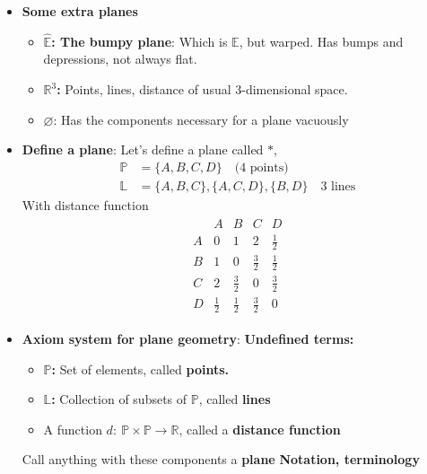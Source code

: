 \documentclass{report}
\begin{document}
\begin{itemize}
    \item \textbf{Some extra planes}
        \begin{itemize}
            \item \textbf{$\hat{\mathbb{E}}$: The bumpy plane}: Which is $\mathbb{E}$, but warped. Has bumps and depressions, not always flat.
            \item \textbf{$\mathbb{R}^{3}$:} Points, lines, distance of usual 3-dimensional space.
            \item \textbf{$\varnothing$}: Has the components necessary for a plane vacuously
        \end{itemize}
    \item \textbf{Define a plane}: Let's define a plane called $*$, 
        \begin{align*}
            \mathbb{P} &= \{A,B,C,D\} \quad \text{(4 points)} \\
            \mathbb{L} &= \{A,B,C\}, \{A,C,D\}, \{B,D\} \quad \text{3 lines}
        \end{align*}
        With distance function
        \begin{align*}
            \begin{array}{c|cccc}
               &A&B&C&D \\
               \hline
                A&0&1&2&\frac{1}{2} \\
                B&1&0&\frac{3}{2} &\frac{1}{2} \\
                C&2&\frac{3}{2}&0&\frac{3}{2} \\
                D&\frac{1}{2} &\frac{1}{2}&\frac{3}{2}&0
            \end{array}
        \end{align*}
    \item \textbf{Axiom system for plane geometry}: 
        \bigbreak \noindent 
        \textbf{Undefined terms:}
        \begin{itemize}
            \item \textbf{$\mathbb{P}$:} Set of elements, called \textbf{points.}
            \item \textbf{$\mathbb{L}$:} Collection of subsets of $\mathbb{P}$, called \textbf{lines}
            \item A function $d:\ \mathbb{P}\times \mathbb{P} \to \mathbb{R} $, called a \textbf{distance function}
        \end{itemize}
        \bigbreak \noindent 
        Call anything with these components a \textbf{plane}
        \bigbreak \noindent 
        \textbf{Notation, terminology}

\end{itemize}
\end{document}
